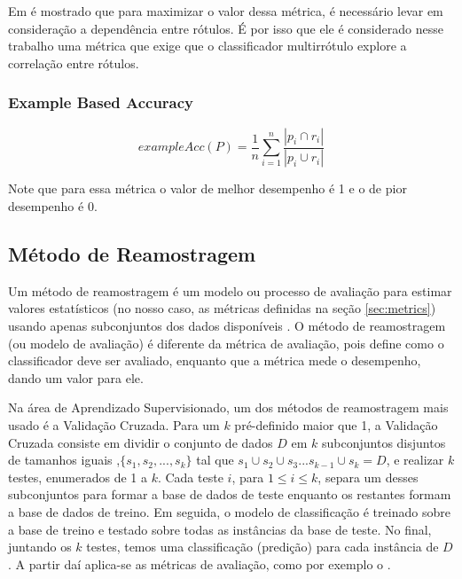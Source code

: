 Em \cite{pcc2010} é mostrado que para maximizar o valor dessa métrica, é necessário levar
em consideração a dependência entre rótulos. É por isso que ele é considerado nesse trabalho
uma métrica que exige que o classificador multirrótulo explore a correlação entre rótulos.


\subsubsection{Example Based Accuracy}
\begin{equation}
 exampleAcc(P)=\frac{1}{n} \sum_{i=1}^n{\frac{| p_i \cap r_i|}{| p_i \cup r_i|}}
\end{equation}

Note que para essa métrica o valor de melhor desempenho é 1 e o de pior desempenho é 0.

\subsection{Método de Reamostragem}
\label{sec:modelav}

Um método de reamostragem é um modelo ou processo de avaliação para estimar valores estatísticos
(no nosso caso, as métricas definidas na seção \ref{sec:metrics}) usando apenas subconjuntos dos dados
disponíveis \cite{yu2003resampling}.
O método de reamostragem (ou modelo de avaliação) é diferente da métrica de avaliação,
pois define como o classificador deve ser avaliado, enquanto que a métrica mede o desempenho, dando um
valor para ele.

Na área de Aprendizado Supervisionado, um dos métodos de reamostragem mais usado é a Validação Cruzada.
Para um $k$ pré-definido maior que 1, a Validação Cruzada consiste
em dividir o conjunto de dados $D$
em $k$ subconjuntos disjuntos de tamanhos iguais
,$\{s_1,s_2,...,s_k\}$ tal que $s_1 \cup s_2 \cup s_3...s_{k-1}\cup s_k=D$,
e realizar $k$ testes, enumerados de 1 a $k$.
Cada teste $i$, para $1\leq i \leq k$, separa um desses subconjuntos
para formar a base de dados de teste
enquanto os restantes formam a base de dados de treino. 
Em seguida, o modelo de classificação é treinado sobre a base de treino e testado sobre todas as
instâncias da base de teste.
No final, juntando os $k$ testes, temos uma classificação (predição) para cada instância de $D$.
A partir daí aplica-se as métricas de avaliação, como por exemplo o \HL.


